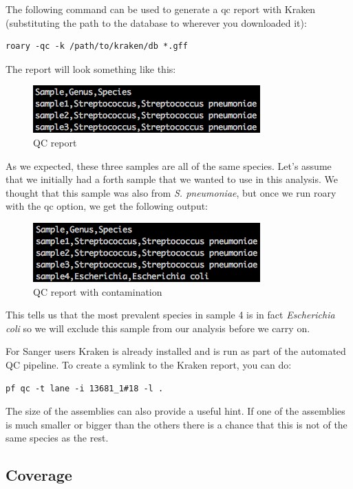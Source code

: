 \documentclass[11pt]{article}
\makeatletter
\def\maxwidth{\ifdim\Gin@nat@width>\linewidth\linewidth
    \else\Gin@nat@width\fi}
\let\Oldincludegraphics\includegraphics
\renewcommand{\includegraphics}[1]{\Oldincludegraphics[width=.8\maxwidth, height=.55\textheight, keepaspectratio]{#1}}
\makeatother
\begin{document}
The following command can be used to generate a qc report with Kraken
(substituting the path to the database to wherever you downloaded it):

\begin{verbatim}
roary -qc -k /path/to/kraken/db *.gff
\end{verbatim}

The report will look something like this:

    \begin{figure}[!h]
\centering
\includegraphics{img/qc_report.png}
\caption{QC report}
\end{figure}

    As we expected, these three samples are all of the same species. Let's
assume that we initially had a forth sample that we wanted to use in
this analysis. We thought that this sample was also from \textit{S.
pneumoniae}, but once we run roary with the qc option, we get the
following output:

    \begin{figure}[!h]
\centering
\includegraphics{img/qc_contamination.png}
\caption{QC report with contamination}
\end{figure}

    This tells us that the most prevalent species in sample 4 is in fact
\textit{Escherichia coli} so we will exclude this sample from our analysis
before we carry on.

For Sanger users Kraken is already installed and is run as part of the
automated QC pipeline. To create a symlink to the Kraken report, you can
do:

\begin{verbatim}
pf qc -t lane -i 13681_1#18 -l .
\end{verbatim}

The size of the assemblies can also provide a useful hint. If one of the
assemblies is much smaller or bigger than the others there is a chance
that this is not of the same species as the rest.

\hypertarget{coverage}{%
\subsection{Coverage}\label{coverage}}
\end{document}
